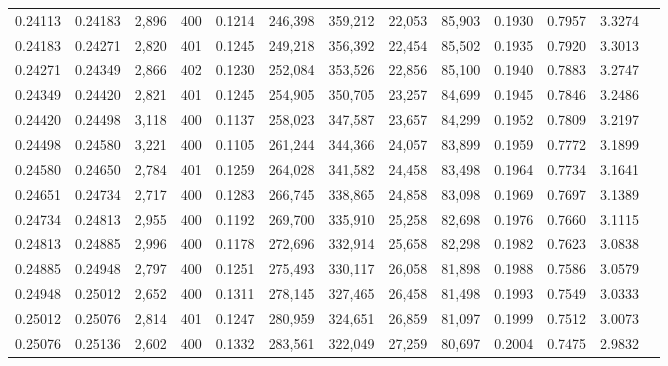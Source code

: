 \begin{tabular}{rrrrrrrrrrrrr}
0.24113 & 0.24183 &  2,896 & 400 &                                     0.1214 & 246,398 & 359,212 &  22,053 &  85,903 & 0.1930 & 0.7957 & 3.3274 \\
0.24183 & 0.24271 &  2,820 & 401 &                                     0.1245 & 249,218 & 356,392 &  22,454 &  85,502 & 0.1935 & 0.7920 & 3.3013 \\
0.24271 & 0.24349 &  2,866 & 402 &                                     0.1230 & 252,084 & 353,526 &  22,856 &  85,100 & 0.1940 & 0.7883 & 3.2747 \\
0.24349 & 0.24420 &  2,821 & 401 &                                     0.1245 & 254,905 & 350,705 &  23,257 &  84,699 & 0.1945 & 0.7846 & 3.2486 \\
0.24420 & 0.24498 &  3,118 & 400 &                                     0.1137 & 258,023 & 347,587 &  23,657 &  84,299 & 0.1952 & 0.7809 & 3.2197 \\
0.24498 & 0.24580 &  3,221 & 400 &                                     0.1105 & 261,244 & 344,366 &  24,057 &  83,899 & 0.1959 & 0.7772 & 3.1899 \\
0.24580 & 0.24650 &  2,784 & 401 &                                     0.1259 & 264,028 & 341,582 &  24,458 &  83,498 & 0.1964 & 0.7734 & 3.1641 \\
0.24651 & 0.24734 &  2,717 & 400 &                                     0.1283 & 266,745 & 338,865 &  24,858 &  83,098 & 0.1969 & 0.7697 & 3.1389 \\
0.24734 & 0.24813 &  2,955 & 400 &                                     0.1192 & 269,700 & 335,910 &  25,258 &  82,698 & 0.1976 & 0.7660 & 3.1115 \\
0.24813 & 0.24885 &  2,996 & 400 &                                     0.1178 & 272,696 & 332,914 &  25,658 &  82,298 & 0.1982 & 0.7623 & 3.0838 \\
0.24885 & 0.24948 &  2,797 & 400 &                                     0.1251 & 275,493 & 330,117 &  26,058 &  81,898 & 0.1988 & 0.7586 & 3.0579 \\
0.24948 & 0.25012 &  2,652 & 400 &                                     0.1311 & 278,145 & 327,465 &  26,458 &  81,498 & 0.1993 & 0.7549 & 3.0333 \\
0.25012 & 0.25076 &  2,814 & 401 &                                     0.1247 & 280,959 & 324,651 &  26,859 &  81,097 & 0.1999 & 0.7512 & 3.0073 \\
0.25076 & 0.25136 &  2,602 & 400 &                                     0.1332 & 283,561 & 322,049 &  27,259 &  80,697 & 0.2004 & 0.7475 & 2.9832 \\

\end{tabular}
